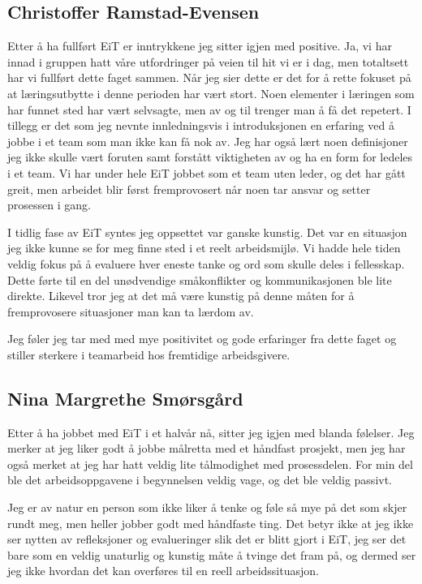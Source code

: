 \subsection*{Christoffer Ramstad-Evensen}
Etter å ha fullført EiT er inntrykkene jeg sitter igjen med positive. Ja, vi har innad i gruppen hatt våre utfordringer
på veien til hit vi er i dag, men totaltsett har vi fullført dette faget sammen. Når jeg sier dette er det for å rette 
fokuset på at læringsutbytte i denne perioden har vært stort. Noen elementer i læringen som har funnet sted
har vært selvsagte, men av og til trenger man å få det repetert. I tillegg er det som jeg nevnte innledningsvis
i introduksjonen en erfaring ved å jobbe i et team som man ikke kan få nok av. Jeg har også lært noen 
definisjoner jeg ikke skulle vært foruten samt forstått viktigheten av og ha en form for ledeles i et team. 
Vi har under hele EiT jobbet som et team uten leder, og det har gått greit, men arbeidet blir først fremprovosert
når noen tar ansvar og setter prosessen i gang. 

I tidlig fase av EiT syntes jeg oppsettet var ganske kunstig. Det var en situasjon jeg ikke kunne se for meg
finne sted i et reelt arbeidsmijlø. Vi hadde hele tiden veldig fokus på å evaluere hver eneste tanke og ord som
skulle deles i fellesskap. Dette førte til en del unødvendige småkonflikter og kommunikasjonen ble lite direkte. 
Likevel tror jeg at det må være kunstig på denne måten for å fremprovosere situasjoner man kan ta lærdom av.

Jeg føler jeg tar med med mye positivitet og gode erfaringer fra dette faget og stiller sterkere i teamarbeid hos
fremtidige arbeidsgivere.

\subsection*{Nina Margrethe Smørsgård}
Etter å ha jobbet med EiT i et halvår nå, sitter jeg igjen med blanda følelser. 
Jeg merker at jeg liker godt å jobbe målretta med et håndfast prosjekt, men jeg 
har også merket at jeg har hatt veldig lite tålmodighet med prosessdelen. For 
min del ble det arbeidsoppgavene i begynnelsen veldig vage, og det ble veldig passivt.

Jeg er av natur en person som ikke liker å tenke og føle så mye på det som skjer 
rundt meg, men heller jobber godt med håndfaste ting. Det betyr ikke at jeg ikke ser 
nytten av refleksjoner og evalueringer slik det er blitt gjort i EiT, jeg ser det 
bare som en veldig unaturlig og kunstig måte å tvinge det fram på, og dermed ser 
jeg ikke hvordan det kan overføres til en reell arbeidssituasjon.


